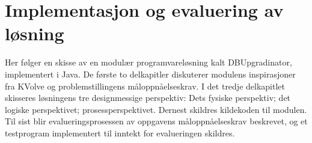 
\chapter{Implementasjon og evaluering av løsning}

Her følger en skisse av en modulær programvareløsning kalt DBUpgradinator, implementert i Java. De første to delkapitler diskuterer modulens inspirasjoner fra KVolve og problemstillingens måloppnåelseskrav. I det tredje delkapitlet skisseres løsningens tre designmessige perspektiv: Dets fysiske perspektiv; det logiske perspektivet; prosessperspektivet. Dernest skildres kildekoden til modulen. Til sist blir evalueringsprosessen av oppgavens måloppnåelseskrav beskrevet, og et testprogram implementert til inntekt for evalueringen skildres.





\cleardoublepage
